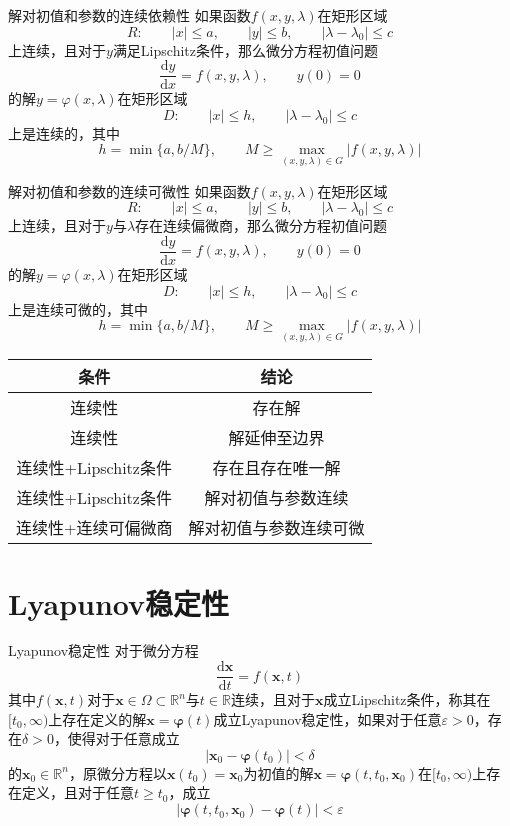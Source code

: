 \documentclass[lang = cn, scheme = chinese, thmcnt = section]{elegantbook}
\newcommand{\R}{\mathbb{R}}            %
\newcommand{\sub}{\subset}             %
\newcommand{\bs}{\boldsymbol}          %
\newcommand{\dd}{\mathrm{d}}           %
\begin{document}
\begin{theorem}{解对初值和参数的连续依赖性}
	如果函数$f(x,y,\lambda)$在矩形区域%
	$$
	R:\qquad 
	|x|\le a,\qquad 
	|y|\le b,\qquad 
	|\lambda-\lambda_0|\le c
	$$
	上连续，且对于$y$满足Lipschitz条件，那么微分方程初值问题
	$$
	\frac{\dd y}{\dd x}=f(x,y,\lambda),\qquad 
	y(0)=0
	$$
	的解$y=\varphi(x,\lambda)$在矩形区域%
	$$
	D:\qquad 
	|x|\le h,\qquad 
	|\lambda-\lambda_0|\le c
	$$
	上是连续的，其中%
	$$
	h=\min\{ a,b/M \},\qquad 
	M\ge \max_{(x,y,\lambda)\in G}|f(x,y,\lambda)|
	$$
\end{theorem}

\begin{theorem}{解对初值和参数的连续可微性}
	如果函数$f(x,y,\lambda)$在矩形区域%
	$$
	R:\qquad 
	|x|\le a,\qquad 
	|y|\le b,\qquad 
	|\lambda-\lambda_0|\le c
	$$
	上连续，且对于$y$与$\lambda$存在连续偏微商，那么微分方程初值问题
	$$
	\frac{\dd y}{\dd x}=f(x,y,\lambda),\qquad 
	y(0)=0
	$$
	的解$y=\varphi(x,\lambda)$在矩形区域%
	$$
	D:\qquad 
	|x|\le h,\qquad 
	|\lambda-\lambda_0|\le c
	$$
	上是连续可微的，其中%
	$$
	h=\min\{ a,b/M \},\qquad 
	M\ge \max_{(x,y,\lambda)\in G}|f(x,y,\lambda)|
	$$
\end{theorem}

\begin{table}[H]
	\centering
	\begin{tabular}{cc}
		\toprule
		\textbf{条件} & \textbf{结论} \\
		\midrule
		连续性 & 存在解 \\
		连续性 & 解延伸至边界 \\
		连续性+Lipschitz条件 & 存在且存在唯一解 \\
		连续性+Lipschitz条件 & 解对初值与参数连续 \\
		连续性+连续可偏微商 & 解对初值与参数连续可微 \\
		\bottomrule
	\end{tabular}
\end{table}

\section{Lyapunov稳定性}

\begin{definition}{Lyapunov稳定性}
	对于微分方程%
	$$
	\frac{\dd \bs{x}}{\dd t}=f(\bs{x},t)
	$$
	其中$f(\bs{x},t)$对于$\bs{x}\in \Omega\sub\R^n$与$t\in\R$连续，且对于$\bs{x}$成立Lipschitz条件，称其在$[t_0,\infty)$上存在定义的解$\bs{x}=\bs{\varphi}(t)$成立Lyapunov稳定性，如果对于任意$\varepsilon>0$，存在$\delta>0$，使得对于任意成立%
	$$
	|\bs{x}_0-\bs{\varphi}(t_0)|<\delta
	$$
	的$\bs{x}_0\in\R^n$，原微分方程以$\bs{x}(t_0)=\bs{x}_0$为初值的解$\bs{x}=\bs{\varphi}(t,t_0,\bs{x}_0)$在$[t_0,\infty)$上存在定义，且对于任意$t\ge t_0$，成立
	$$
	|\bs{\varphi}(t,t_0,\bs{x}_0)-\bs{\varphi}(t)|<\varepsilon
	$$
\end{definition}
\end{document}
